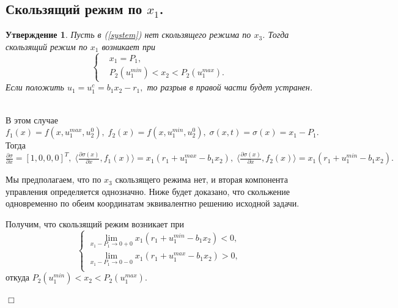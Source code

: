 \documentclass[11pt]{article}
\newtheorem{statement}{Утверждение}
\newenvironment{Proof}
{\par\noindent{\bf Доказательство.\\}} 
{\begin{flushright}$\Box$\end{flushright}}
\newcommand\Ref[1]{(\ref{#1})}
\newcommand\RS{\Ref{system} }
\newcommand\dd[2]{\frac{\partial#1}{\partial#2}}
\begin{document}
\subsection{Скользящий режим по $x_1$.}
\begin{statement}
	Пусть в \RS нет скользящего режима по $x_3$. Тогда скользящий режим по $x_1$ возникает при 
	$$
        	\left\{
        \begin{aligned}
        		&x_1 = P_1, \\
        		&P_2(u_1^{min}) < x_2 < P_2(u_1^{max}).
        \end{aligned}
        \right.
	$$
	Если положить $u_1 = u_1^c = b_1x_2 - r_1,$ то разрыв в правой части будет устранен.
\end{statement}
\begin{Proof}\\
    \indent В этом случае 
    $f_1(x) = f(x, u_1^{max}, u_2^0), \; f_2(x) = f(x, u_1^{min}, u_2^0), \; \sigma(x,t) = \sigma(x) = x_1 - P_1.$
    Тогда $\dd{\sigma}{x} = [1,0,0,0]^T, \; \langle \dd{\sigma(x)}{x}, f_1(x) \rangle = x_1(r_1 + u_1^{max}  - b_1x_2), \; \langle \dd{\sigma(x)}{x}, f_2(x) \rangle = x_1(r_1 + u_1^{min}  - b_1x_2).$
    
    Мы предполагаем, что по $x_3$ скользящего режима нет, и вторая компонента управления определяется однозначно. Ниже будет доказано, что скольжение одновременно по обеим координатам эквивалентно решению исходной задачи.
    
    Получим, что скользящий режим возникает при 
    $$
    \left\{
    \begin{aligned}
    	\lim_{x_1 - P_1 \to 0 + 0} x_1(r_1 + u_1^{min} - b_1x_2) < 0, \\
    	\lim_{x_1 - P_1 \to 0 - 0} x_1(r_1 + u_1^{max} - b_1x_2) > 0, \\
    \end{aligned}
    \right.
    $$
    откуда $P_2(u_1^{min}) < x_2 < P_2(u_1^{max}).$
    

\end{Proof}
\end{document}

